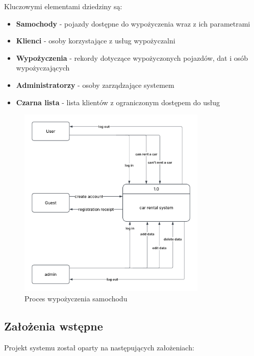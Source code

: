 \documentclass[12pt,a4paper]{article}
\begin{document}
Kluczowymi elementami dziedziny są:
\begin{itemize}
    \item \textbf{Samochody} - pojazdy dostępne do wypożyczenia wraz z ich parametrami
    \item \textbf{Klienci} - osoby korzystające z usług wypożyczalni
    \item \textbf{Wypożyczenia} - rekordy dotyczące wypożyczonych pojazdów, dat i osób wypożyczających
    \item \textbf{Administratorzy} - osoby zarządzające systemem
    \item \textbf{Czarna lista} - lista klientów z ograniczonym dostępem do usług
\end{itemize}

\begin{figure}[H]
    \centering
    \includegraphics[width=0.8\textwidth]{dfd_lvl_0.png}
    \caption{Proces wypożyczenia samochodu}
    \label{fig:proces-wypozyczenia}
\end{figure}

\newpage

\subsection{Założenia wstępne}

Projekt systemu został oparty na następujących założeniach:
\end{document}
